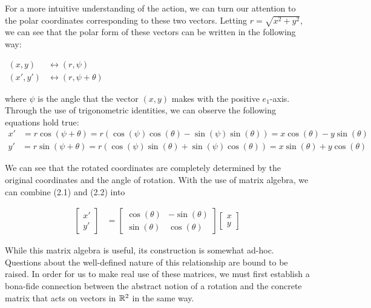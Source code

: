 For a more intuitive understanding of the action, we can turn our attention to the polar coordinates corresponding to these two vectors. Letting $r = \sqrt{x^2 + y^2}$, we can see that the polar form of these vectors can be written in the following way:
\begin{center}
	$\begin{aligned}
		(x,y) &\leftrightarrow (r,\psi)\\
		(x',y') &\leftrightarrow (r,\psi+\theta)
	\end{aligned}$
\end{center}
where $\psi$ is the angle that the vector $(x,y)$ makes with the positive $e_1$-axis. Through the use of trigonometric identities, we can observe the following equations hold true:
\begin{equation}
	\begin{aligned}
		x' &= r\cos(\psi+\theta) = r\left(\cos(\psi)\cos(\theta) - \sin(\psi)\sin(\theta)\right) = x\cos(\theta) -y\sin(\theta)
	\end{aligned}
\end{equation}
\begin{equation}
	\begin{aligned}
		y' &= r\sin(\psi+\theta) = r\left(\cos(\psi)\sin(\theta) + \sin(\psi)\cos(\theta)\right) = x\sin(\theta) +y\cos(\theta)
	\end{aligned}
\end{equation}	

We can see that the rotated coordinates are completely determined by the original coordinates and the angle of rotation. With the use of matrix algebra, we can combine (2.1) and (2.2) into 

\begin{equation}
	\begin{aligned}
		\begin{bmatrix}
			x' \\
			y'
		\end{bmatrix} &=
		\begin{bmatrix}
			\cos(\theta) & -\sin(\theta) \\
			\sin(\theta) & \cos(\theta)
		\end{bmatrix}
		\begin{bmatrix}
			x \\
			y
		\end{bmatrix}
	\end{aligned}
\end{equation}

While this matrix algebra is useful, its construction is somewhat ad-hoc. Questions about the well-defined nature of this relationship are bound to be raised. In order for us to make real use of these matrices, we must first establish a bona-fide connection between the abstract notion of a rotation and the concrete matrix that acts on vectors in $\mathbb{R}^2$ in the same way.

